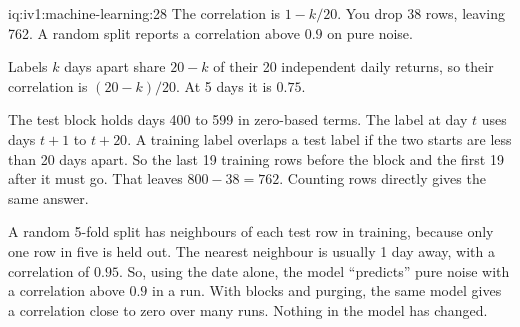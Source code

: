 \begin{solution}{iq:iv1:machine-learning:28}
The correlation is $1 - k/20$. You drop 38 rows, leaving 762. A random split reports a correlation above $0.9$ on pure noise.

Labels $k$ days apart share $20 - k$ of their 20 independent daily returns, so their correlation is $(20 - k)/20$. At 5 days it is $0.75$.

The test block holds days 400 to 599 in zero-based terms. The label at day $t$ uses days $t + 1$ to $t + 20$. A training label overlaps a test label if the two starts are less than 20 days apart. So the last 19 training rows before the block and the first 19 after it must go. That leaves $800 - 38 = 762$. Counting rows directly gives the same answer.

A random 5-fold split has neighbours of each test row in training, because only one row in five is held out. The nearest neighbour is usually 1 day away, with a correlation of $0.95$. So, using the date alone, the model ``predicts'' pure noise with a correlation above $0.9$ in a run. With blocks and purging, the same model gives a correlation close to zero over many runs. Nothing in the model has changed.



\end{solution}

